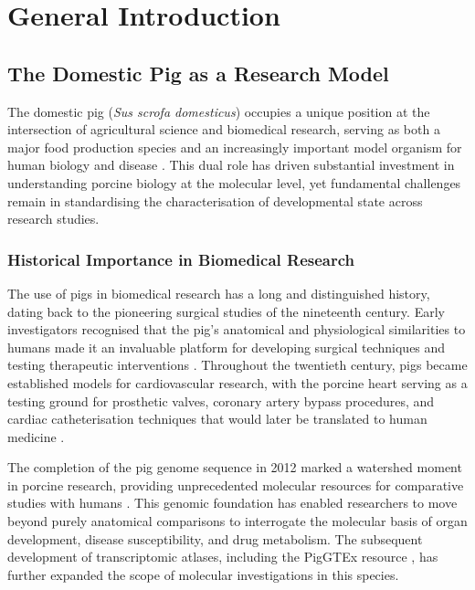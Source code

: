 \chapter{General Introduction}\label{chapter:intro}

\clearpage
\FloatBarrier

\section{The Domestic Pig as a Research Model}\label{sec:intro:pig_model}

The domestic pig (\textit{Sus scrofa domesticus}) occupies a unique position at the intersection of agricultural science and biomedical research, serving as both a major food production species and an increasingly important model organism for human biology and disease \parencite{swindle_swine_2012, lunney_importance_2021, meurens_pig_2012}. This dual role has driven substantial investment in understanding porcine biology at the molecular level, yet fundamental challenges remain in standardising the characterisation of developmental state across research studies.

\subsection{Historical Importance in Biomedical Research}

The use of pigs in biomedical research has a long and distinguished history, dating back to the pioneering surgical studies of the nineteenth century. Early investigators recognised that the pig's anatomical and physiological similarities to humans made it an invaluable platform for developing surgical techniques and testing therapeutic interventions \parencite{swindle_swine_2012}. Throughout the twentieth century, pigs became established models for cardiovascular research, with the porcine heart serving as a testing ground for prosthetic valves, coronary artery bypass procedures, and cardiac catheterisation techniques that would later be translated to human medicine \parencite{swindle_swine_2012}.

The completion of the pig genome sequence in 2012 marked a watershed moment in porcine research, providing unprecedented molecular resources for comparative studies with humans \parencite{groenen_analyses_2012}. This genomic foundation has enabled researchers to move beyond purely anatomical comparisons to interrogate the molecular basis of organ development, disease susceptibility, and drug metabolism. The subsequent development of transcriptomic atlases, including the PigGTEx resource \parencite{teng_compendium_2024, chen_construction_2025}, has further expanded the scope of molecular investigations in this species.

